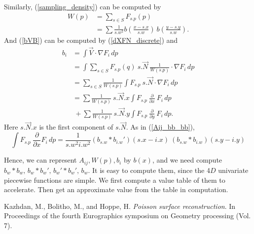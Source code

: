 \documentclass[11pt,twoside]{article}
\begin{document}
Similarly, (\ref{sampling_density}) can be computed by
\begin{equation}\label{WpsSFspp}
\begin{aligned}
W (p)
&= \sum_{s \in S} F_{s.p} (p)\\
&=\sum \frac{1}{s.w^2} b (\frac{x-s.x}{s.w}) \  b(\frac{y-s.y}{s.w}).
\end{aligned}
\end{equation}
And (\ref{bVB}) can be computed by (\ref{dXFN_discrete}) and
\begin{equation}\label{biVFidp}
\begin{aligned}
b_i &=\int \vec V \cdot \nabla{F}_i\,  dp\\
&=\int \sum_{s \in S}  F_{s.p} (q) \  s.\vec{N} \  \frac{1}{W(s.p)} \cdot \nabla{F}_i\,  dp\\
&=\sum_{s \in S} \frac{1}{W(s.p)} \int F_{s.p} \  s.\vec{N} \cdot \nabla{F}_i\, dp\\
&=\sum \frac{1}{W(s.p)} \  s.\vec{N} .x \int F_{s.p}\ \frac{\partial}{\partial x}\ F_i\, dp\\
&\  +\sum \frac{1}{W(s.p)} \  s.\vec{N} .y\int F_{s.p}\ \frac{\partial}{\partial y}\ F_i\, dp.
\end{aligned}
\end{equation}
Here \( s.\vec{N}.x\) is the first component of \(s.\vec{N}\).
As in (\ref{Aij_bb_bb}),
\begin{equation}\label{FspxFip}
\int F_{s.p}\ \frac{\partial}{\partial x} F_i\, dp
= \frac{1}{s.w^2 i.w^2} (b_{s.w}*b_{i.w}')(s.x-i.x)
\  (b_{s.w}*b_{i.w})(s.y-i.y)
\end{equation}

Hence, we can represent \( A_{ij},W(p),b_i\) by \(b(x)\),
and we need compute \(b_w*b_w,\, b_w*b_w',\, b_w'*b_w',\, b_w\).
It is easy to compute them, 
since the 4\(D\) univariate piecewise functions are simple.
We first compute a value table of them to accelerate.
Then get an approximate value from the table in computation.

\begin{thebibliography}{99}


 Kazhdan, M., Bolitho, M., and Hoppe, H.
 {\em Poisson surface reconstruction}.
 In Proceedings of the fourth Eurographics symposium on Geometry processing (Vol. 7).



\end{thebibliography}
\end{document}
